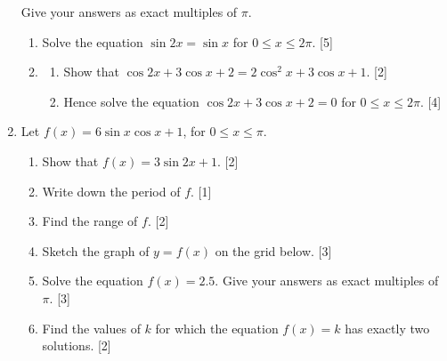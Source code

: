 \documentclass[12pt, twoside]{article}
\begin{document}
\begin{enumerate}[itemsep=0.15cm]
Give your answers as exact multiples of $\pi$.

\begin{enumerate}[itemsep=0.1cm]
  \item Solve the equation $\sin 2x = \sin x$ for $0 \le x \le 2\pi$.
  \hfill [5]
  \item
  \begin{enumerate}[label=(\roman*), itemsep=0.05cm]
    \item Show that $\cos 2x + 3\cos x + 2 = 2\cos^{2}x + 3\cos x + 1$.
    \hfill [2]
    \item Hence solve the equation $\cos 2x + 3\cos x + 2 = 0$ for
    $0 \le x \le 2\pi$. \hfill [4]
  \end{enumerate}
\end{enumerate}


\newpage

\item[4.] [Maximum mark: 13]

Let $f(x) = 6\sin x\cos x + 1$, for $0 \le x \le \pi$.

\begin{enumerate}[itemsep=0.1cm]
  \item Show that $f(x) = 3\sin 2x + 1$. \hfill [2]
  \item Write down the period of $f$. \hfill [1]
  \item Find the range of $f$. \hfill [2]
  \item Sketch the graph of $y = f(x)$ on the grid below. \hfill [3]
  \item Solve the equation $f(x) = 2.5$. Give your answers as exact
  multiples of $\pi$. \hfill [3]
  \item Find the values of $k$ for which the equation $f(x) = k$ has
  exactly two solutions. \hfill [2]
\end{enumerate}

\begin{center}
\end{center}


\end{enumerate}
\end{document}
